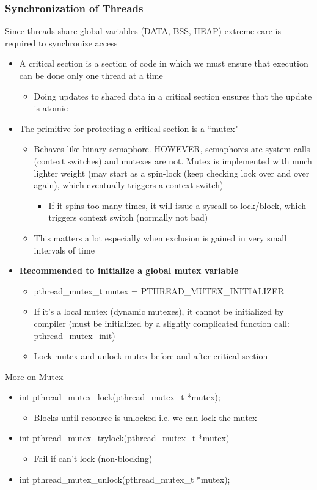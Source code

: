 \subsubsection{Synchronization of Threads}
Since threads share global variables (DATA, BSS, HEAP) extreme care is required to synchronize access
\begin{itemize}
    \item A critical section is a section of code in which we must ensure that execution can be done only one thread at a time
    \begin{itemize}
        \item Doing updates to shared data in a critical section ensures that the update is atomic
    \end{itemize}
    \item The primitive for protecting a critical section is a ``mutex"
    \begin{itemize}
        \item Behaves like binary semaphore. HOWEVER, semaphores are system calls (context switches) and mutexes are not. Mutex is implemented with much lighter weight (may start as a spin-lock (keep checking lock over and over again), which eventually triggers a context switch)
        \begin{itemize}
            \item If it spins too many times, it will issue a syscall to lock/block, which triggers context switch (normally not bad)
        \end{itemize}
        \item This matters a lot especially when exclusion is gained in very small intervals of time
    \end{itemize}
    \item \textbf{Recommended to initialize a global mutex variable}
    \begin{itemize}
        \item pthread\_mutex\_t mutex = PTHREAD\_MUTEX\_INITIALIZER
        \item If it's a local mutex (dynamic mutexes), it cannot be initialized by compiler (must be initialized by a slightly complicated function call: pthread\_mutex\_init)
        \item Lock mutex and unlock mutex before and after critical section
    \end{itemize}
\end{itemize}
More on Mutex
\begin{itemize}
    \item int pthread\_mutex\_lock(pthread\_mutex\_t *mutex);
    \begin{itemize}
        \item Blocks until resource is unlocked i.e. we can lock the mutex
    \end{itemize}
    \item int pthread\_mutex\_trylock(pthread\_mutex\_t *mutex)
    \begin{itemize}
        \item Fail if can't lock (non-blocking)
    \end{itemize}
    \item int pthread\_mutex\_unlock(pthread\_mutex\_t *mutex);
\end{itemize}
